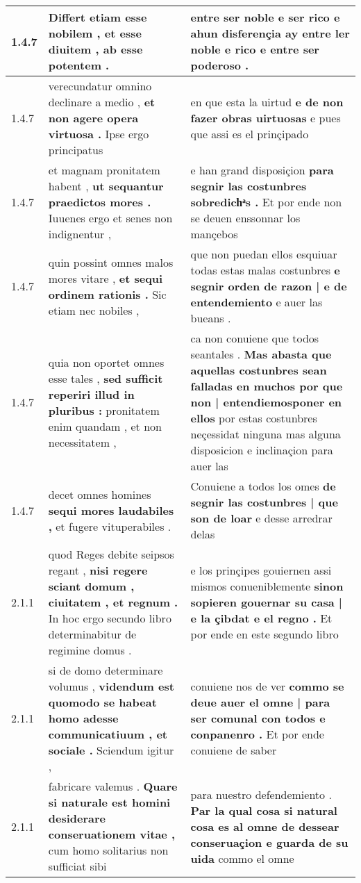 \begin{tabular}{|p{1cm}|p{6.5cm}|p{6.5cm}|}
1.4.7 & Differt etiam esse nobilem , \textbf{ et esse diuitem , } ab esse potentem . & entre ser noble e ser rico \textbf{ e ahun disferençia ay entre ler noble e rico } e entre ser poderoso . \\\hline
1.4.7 & verecundatur omnino declinare a medio , \textbf{ et non agere opera virtuosa . } Ipse ergo principatus & en que esta la uirtud \textbf{ e de non fazer obras uirtuosas } e pues que assi es el prinçipado \\\hline
1.4.7 & et magnam pronitatem habent , \textbf{ ut sequantur praedictos mores . } Iuuenes ergo et senes non indignentur , & e han grand disposiçion \textbf{ para segnir las costunbres sobredichͣs . } Et por ende non se deuen enssonnar los mançebos \\\hline
1.4.7 & quin possint omnes malos mores vitare , \textbf{ et sequi ordinem rationis . } Sic etiam nec nobiles , & que non puedan ellos esquiuar todas estas malas costunbres \textbf{ e segnir orden de razon | e de entendemiento } e auer las bueans . \\\hline
1.4.7 & quia non oportet omnes esse tales , \textbf{ sed sufficit reperiri illud in pluribus : } pronitatem enim quandam , et non necessitatem , & ca non conuiene que todos seantales . \textbf{ Mas abasta que aquellas costunbres sean falladas en muchos por que non | entendiemosponer en ellos } por estas costunbres neçessidat ninguna mas alguna disposicion e inclinaçion para auer las \\\hline
1.4.7 & decet omnes homines \textbf{ sequi mores laudabiles , } et fugere vituperabiles . & Conuiene a todos los omes \textbf{ de segnir las costunbres | que son de loar } e desse arredrar delas \\\hline
2.1.1 & quod Reges debite seipsos regant , \textbf{ nisi regere sciant domum , ciuitatem , et regnum . } In hoc ergo secundo libro determinabitur de regimine domus . & e los prinçipes gouiernen assi mismos conueniblemente \textbf{ sinon sopieren gouernar su casa | e la çibdat e el regno . } Et por ende en este segundo libro \\\hline
2.1.1 & si de domo determinare volumus , \textbf{ videndum est quomodo se habeat homo adesse communicatiuum , et sociale . } Sciendum igitur , & conuiene nos de ver \textbf{ commo se deue auer el omne | para ser comunal con todos e conpanenro . } Et por ende conuiene de saber \\\hline
2.1.1 & fabricare valemus . \textbf{ Quare si naturale est homini desiderare conseruationem vitae , } cum homo solitarius non sufficiat sibi & para nuestro defendemiento . \textbf{ Par la qual cosa si natural cosa es al omne de dessear conseruaçion e guarda de su uida } commo el omne \\\hline

\end{tabular}

